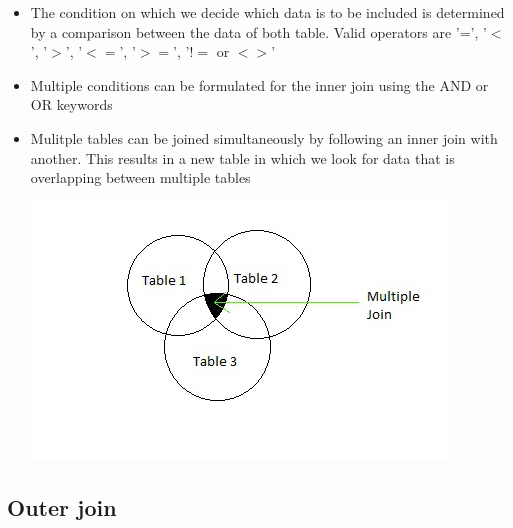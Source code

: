 \documentclass{article}
\begin{document}
\begin{itemize}
    \item The condition on which we decide which data is to be included is determined by a comparison between the data of both table. Valid operators are '=', '$<$', '$>$', '$<=$', '$>=$', '$!=$ or $<>$'
    \item Multiple conditions can be formulated for the inner join using the AND or OR keywords
    \item Mulitple tables can be joined simultaneously by following an inner join with another. This results in a new table in which we look for data that is overlapping between multiple tables
    \begin{center}
        \includegraphics{img/multipleInner.jpg}
    \end{center}
\end{itemize}

\subsection{Outer join}
\end{document}
